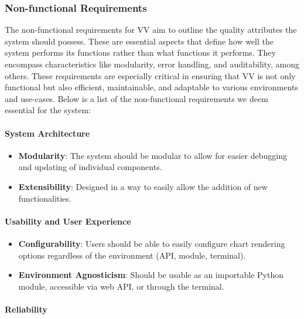 \subsubsection{Non-functional
Requirements}\label{non-functional-requirements}

The non-functional requirements for VV aim to outline the quality
attributes the system should possess. These are essential aspects that
define how well the system performs its functions rather than what
functions it performs. They encompass characteristics like modularity,
error handling, and auditability, among others. These requirements are
especially critical in ensuring that VV is not only functional but also
efficient, maintainable, and adaptable to various environments and
use-cases. Below is a list of the non-functional requirements we deem
essential for the system:

\paragraph{System Architecture}\label{system-architecture}

\begin{itemize}
\item
  \textbf{Modularity}: The system should be modular to allow for easier
  debugging and updating of individual components.
\item
  \textbf{Extensibility}: Designed in a way to easily allow the addition
  of new functionalities.
\end{itemize}

\paragraph{Usability and User
Experience}\label{usability-and-user-experience}

\begin{itemize}
\item
  \textbf{Configurability}: Users should be able to easily configure
  chart rendering options regardless of the environment (API, module,
  terminal).
\item
  \textbf{Environment Agnosticism}: Should be usable as an importable
  Python module, accessible via web API, or through the terminal.
\end{itemize}

\paragraph{Reliability}\label{reliability}

